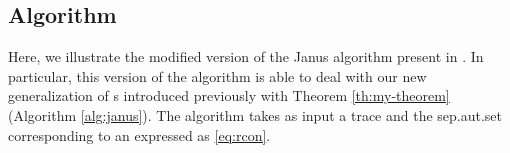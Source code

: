 
\subsection{Algorithm}\label{sec:janus-alg}
Here, we illustrate the modified version of the Janus algorithm present in \citep{cecconi2018interestingness}. In particular, this version of the algorithm is able to deal with our new generalization of \rcon s introduced previously with Theorem \ref{th:my-theorem} (Algorithm \ref{alg:janus}). The algorithm takes as input a trace and the sep.aut.set corresponding to an \rcon\xspace expressed as \ref{eq:rcon}.

